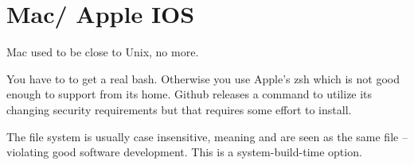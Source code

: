 
\renewcommand{\footerfilename}{MacApple.tex}

\section{Mac/ Apple IOS}

Mac used to be close to Unix, no more.

You have to  to get a real bash. Otherwise you
use Apple's zsh which is not good enough to support  from its
home. Github releases a  command to utilize its changing
security requirements but that requires some effort to install.

The file system is usually case insensitive, meaning  and
 are seen as the same file -- violating good software 
development. This is a system-build-time option.
